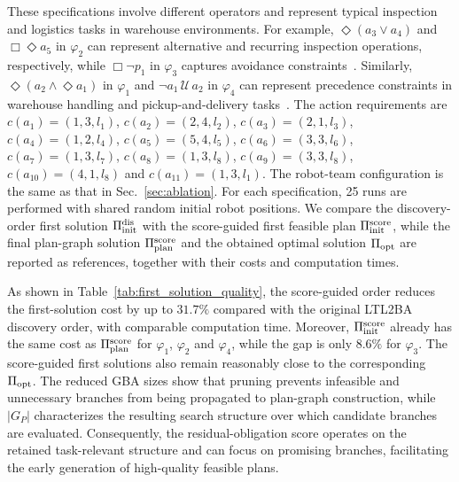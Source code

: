\documentclass[lettersize,journal]{IEEEtran}
\theoremstyle{italiclemma}
\theoremstyle{italiclemma}
\theoremstyle{definition}
\begin{document}
These specifications involve different operators and represent typical inspection and logistics tasks in warehouse environments. For example, $\Diamond(a_3\vee a_4)$ and $\Box\Diamond a_5$ in $\varphi_2$ can represent alternative and recurring inspection operations, respectively, while $\Box\neg p_1$ in $\varphi_3$ captures
avoidance constraints~\cite{9384182}. Similarly,
$\Diamond(a_2\wedge\Diamond a_1)$ in $\varphi_1$ and
$\neg a_1\,\mathcal{U}\,a_2$ in $\varphi_4$ can represent precedence constraints in warehouse handling and pickup-and-delivery tasks~\cite{8122818,luo2024decomposition}. The action requirements are
$c(a_1)=(1,3,l_1)$, $c(a_2)=(2,4,l_2)$,
$c(a_3)=(2,1,l_3)$, $c(a_4)=(1,2,l_4)$,
$c(a_5)=(5,4,l_5)$, $c(a_6)=(3,3,l_6)$,
$c(a_7)=(1,3,l_7)$, $c(a_8)=(1,3,l_8)$,
$c(a_9)=(3,3,l_8)$, 
$c(a_{10})=(4,1,l_8)$ and $c(a_{11})=(1,3,l_1)$. The robot-team configuration is the same as that in Sec.~\ref{sec:ablation}. For each specification, 25 runs are performed with shared random initial robot positions. We compare the discovery-order first solution $\Pi_{\rm init}^{\rm dis}$ with the score-guided first feasible plan $\Pi_{\rm init}^{\rm score}$, while the final plan-graph solution $\Pi_{\rm plan}^{\rm score}$ and the obtained optimal solution $\Pi_{\rm opt}$ are reported as references, together with their costs and computation times.


As shown in  Table~\ref{tab:first_solution_quality}, the score-guided order reduces the first-solution cost by up to $31.7\%$ compared with the original LTL2BA discovery order, with comparable computation time. Moreover, $\Pi_{\rm init}^{\rm score}$ already has the same cost as $\Pi_{\rm plan}^{\rm score}$ for $\varphi_1$, $\varphi_2$ and $\varphi_4$, while the gap is only $8.6\%$ for $\varphi_3$.  The score-guided first solutions also remain reasonably close to the corresponding $\Pi_{\rm opt}$. The reduced GBA sizes show that pruning prevents infeasible and unnecessary branches from being propagated to plan-graph construction, while $|G_P|$ characterizes the resulting search structure over which
candidate branches are evaluated. Consequently, the
residual-obligation score operates on the retained task-relevant structure and can focus on promising branches, facilitating the early generation of high-quality feasible plans.
\end{document}
